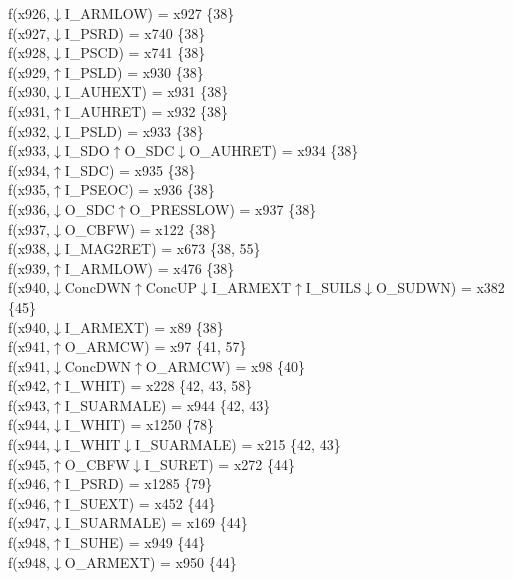 f(x926,$\downarrow$I\_ARMLOW) = x927 \{38\} \\  
f(x927,$\downarrow$I\_PSRD) = x740 \{38\} \\  
f(x928,$\downarrow$I\_PSCD) = x741 \{38\} \\  
f(x929,$\uparrow$I\_PSLD) = x930 \{38\} \\  
f(x930,$\downarrow$I\_AUHEXT) = x931 \{38\} \\  
f(x931,$\uparrow$I\_AUHRET) = x932 \{38\} \\  
f(x932,$\downarrow$I\_PSLD) = x933 \{38\} \\  
f(x933,$\downarrow$I\_SDO$\uparrow$O\_SDC$\downarrow$O\_AUHRET) = x934 \{38\} \\  
f(x934,$\uparrow$I\_SDC) = x935 \{38\} \\  
f(x935,$\uparrow$I\_PSEOC) = x936 \{38\} \\  
f(x936,$\downarrow$O\_SDC$\uparrow$O\_PRESSLOW) = x937 \{38\} \\  
f(x937,$\downarrow$O\_CBFW) = x122 \{38\} \\  
f(x938,$\downarrow$I\_MAG2RET) = x673 \{38, 55\} \\  
f(x939,$\uparrow$I\_ARMLOW) = x476 \{38\} \\  
f(x940,$\downarrow$ConcDWN$\uparrow$ConcUP$\downarrow$I\_ARMEXT$\uparrow$I\_SUILS$\downarrow$O\_SUDWN) = x382 \{45\} \\  
f(x940,$\downarrow$I\_ARMEXT) = x89 \{38\} \\  
f(x941,$\uparrow$O\_ARMCW) = x97 \{41, 57\} \\  
f(x941,$\downarrow$ConcDWN$\uparrow$O\_ARMCW) = x98 \{40\} \\  
f(x942,$\uparrow$I\_WHIT) = x228 \{42, 43, 58\} \\  
f(x943,$\uparrow$I\_SUARMALE) = x944 \{42, 43\} \\  
f(x944,$\downarrow$I\_WHIT) = x1250 \{78\} \\  
f(x944,$\downarrow$I\_WHIT$\downarrow$I\_SUARMALE) = x215 \{42, 43\} \\  
f(x945,$\uparrow$O\_CBFW$\downarrow$I\_SURET) = x272 \{44\} \\  
f(x946,$\uparrow$I\_PSRD) = x1285 \{79\} \\  
f(x946,$\uparrow$I\_SUEXT) = x452 \{44\} \\  
f(x947,$\downarrow$I\_SUARMALE) = x169 \{44\} \\  
f(x948,$\uparrow$I\_SUHE) = x949 \{44\} \\  
f(x948,$\downarrow$O\_ARMEXT) = x950 \{44\} \\  
